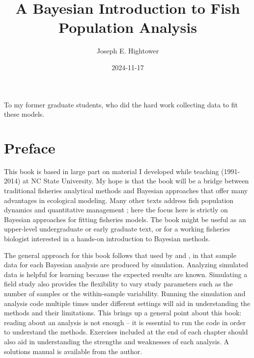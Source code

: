 \documentclass[
]{krantz}
\title{A Bayesian Introduction to Fish Population Analysis}
\author{Joseph E. Hightower}
\date{2024-11-17}
\begin{document}
\maketitle


\thispagestyle{empty}

\begin{center}
To my former graduate students,
who did the hard work collecting data to fit these models.
\end{center}

\setlength{\abovedisplayskip}{-5pt}
\setlength{\abovedisplayshortskip}{-5pt}

{
\hypersetup{linkcolor=}
\setcounter{tocdepth}{2}
\tableofcontents
}
\listoffigures
\hypertarget{preface}{%
\chapter*{Preface}\label{preface}}


This book is based in large part on material I developed while teaching (1991-2014) at NC State University. My hope is that the book will be a bridge between traditional fisheries analytical methods and Bayesian approaches that offer many advantages in ecological modeling. Many other texts address fish population dynamics and quantitative management \citep[e.g.,][]{hilborn.walters_1992, quinn.deriso_1999}; here the focus here is strictly on Bayesian approaches for fitting fisheries models. The book might be useful as an upper-level undergraduate or early graduate text, or for a working fisheries biologist interested in a hands-on introduction to Bayesian methods.

The general approach for this book follows that used by \citet{kéry_2010} and \citet{kéry.schaub_2011}, in that sample data for each Bayesian analysis are produced by simulation. Analyzing simulated data is helpful for learning because the expected results are known. Simulating a field study also provides the flexibility to vary study parameters such as the number of samples or the within-sample variability. Running the simulation and analysis code multiple times under different settings will aid in understanding the methods and their limitations. This brings up a general point about this book: reading about an analysis is not enough -- it is essential to run the code in order to understand the methods. Exercises included at the end of each chapter should also aid in understanding the strengths and weaknesses of each analysis. A solutions manual is available from the author.
\end{document}
